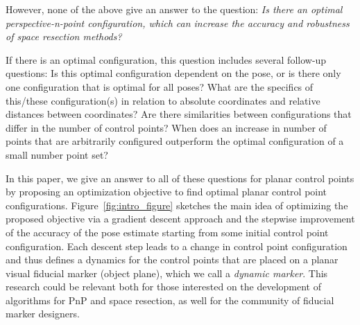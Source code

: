 \documentclass[letterpaper, 10 pt, conference]{ieeeconf}  %
\begin{document}
	However, none of the above give an answer to the question: 
	\textit{Is there an optimal perspective-n-point configuration, which can increase the accuracy and robustness of space resection methods?}
	
	If there is an optimal configuration, this question includes several follow-up questions: 
	Is this optimal configuration dependent on the pose, or is there only one configuration that is optimal for all poses? What are the specifics of this/these configuration(s) in relation to absolute coordinates and relative distances between coordinates? Are there similarities between configurations that differ in the number of control points? When does an increase in number of points that are arbitrarily configured outperform the optimal configuration of a small number point set?  
	
	In this paper, we give an answer to all of these questions for planar control points by proposing an optimization objective to find optimal planar control point configurations. Figure~\ref{fig:intro_figure} sketches the main idea of optimizing the proposed objective via a gradient descent approach and the stepwise improvement of the accuracy of the pose estimate starting from some initial control point configuration. Each descent step leads to a change in control point configuration and thus defines a dynamics for the control points that are placed on a planar visual fiducial marker (object plane), which we call a \textit{dynamic marker}.
	This research could be relevant both for those interested on the development of algorithms for PnP and space resection, as well for the community of fiducial marker designers.
	
	
\end{document}
